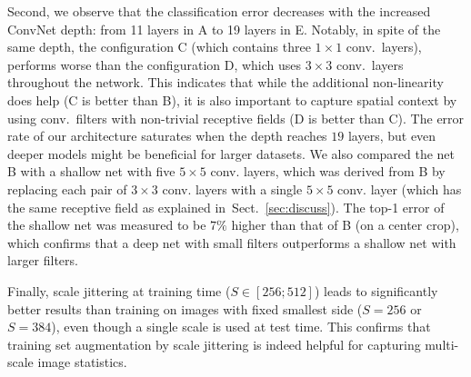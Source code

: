 \documentclass{article} %
\newcommand{\sref}[1]{Sect.~\ref{#1}}
\begin{document}
Second, we observe that the classification error decreases with the increased ConvNet depth: from 11 layers in A to 19 layers in E.
Notably, in spite of the same depth, the configuration C (which contains three $1 \times 1$ conv.\ layers), performs worse than
the configuration D, which uses $3 \times 3$ conv.\ layers throughout the network.
This indicates that while the additional non-linearity does help (C is better than B), it is also important to capture spatial context by using conv.\ filters with non-trivial receptive fields (D is better than C). 
The error rate of our architecture saturates when the depth reaches $19$ layers, but even deeper models might be beneficial for larger datasets.
We also compared the net B with a shallow net with five $5\times5$ conv. layers, which was derived from B by replacing 
each pair of $3\times3$ conv. layers with a single $5\times5$ conv. layer (which has the same receptive field as explained in~\sref{sec:discuss}).
The top-1 error of the shallow net was measured to be $7\%$ higher than that of B (on a center crop), which confirms that a deep net with small 
filters outperforms a shallow net with larger filters. 

Finally, scale jittering at training time ($S \in [256;512]$) leads to significantly better results than training on images with fixed smallest side ($S=256$ or $S=384$),
even though a single scale is used at test time. This confirms that training set augmentation by scale jittering is indeed helpful for capturing multi-scale image statistics.


\vspace{-2em}
\end{document}
